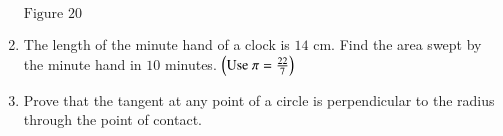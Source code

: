 \documentclass[journal,12pt,onecolumn]{IEEEtran}
\theoremstyle{remark}
\begin{document}
\begin{enumerate}
\begin{figure}[ht]
\end{figure}
\begin{center}
$\text{Figure } 20$
\end{center}
\item The length of the minute hand of a clock is $14\text{ cm}$. Find the area swept by the minute hand in $10$ minutes. $\left(\text{Use } \pi = \frac{22}{7}\right)$ 
\item Prove that the tangent at any point of a circle is perpendicular to the radius through the point of contact. 
\end{enumerate}
\end{document}
